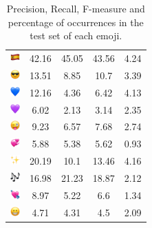 \documentclass{article}
\begin{document}
\begin{table}
\begin{tabular}{|c|ccc|c|}
\includegraphics[height=0.37cm,width=0.37cm]{img/Spain.png} & 42.16 & 45.05 & 43.56 & 4.24\\ 
\includegraphics[height=0.37cm,width=0.37cm]{img/smiling_face_with_sunglasses.png} & 13.51 & 8.85 & 10.7 & 3.39\\ 
\includegraphics[height=0.37cm,width=0.37cm]{img/blue_heart.png} & 12.16 & 4.36 & 6.42 & 4.13\\ 
\includegraphics[height=0.37cm,width=0.37cm]{img/purple_heart.png} & 6.02 & 2.13 & 3.14 & 2.35\\ 
\includegraphics[height=0.37cm,width=0.37cm]{img/winking_face_with_tongue.png} & 9.23 & 6.57 & 7.68 & 2.74\\ 
\includegraphics[height=0.37cm,width=0.37cm]{img/revolving_hearts.png} & 5.88 & 5.38 & 5.62 & 0.93\\ 
\includegraphics[height=0.37cm,width=0.37cm]{img/sparkles.png} & 20.19 & 10.1 & 13.46 & 4.16\\ 
\includegraphics[height=0.37cm,width=0.37cm]{img/musical_notes.png} & 16.98 & 21.23 & 18.87 & 2.12\\ 
\includegraphics[height=0.37cm,width=0.37cm]{img/heart_with_arrow.png} & 8.97 & 5.22 & 6.6 & 1.34\\ 
\includegraphics[height=0.37cm,width=0.37cm]{img/beaming_face_with_smiling_eyes.png} & 4.71 & 4.31 & 4.5 & 2.09\\ 

\hline
\end{tabular}
\caption{\label{table:emoji_detailed} Precision, Recall, F-measure and percentage of occurrences in the test set of each emoji.}
\end{table}
\end{document}
